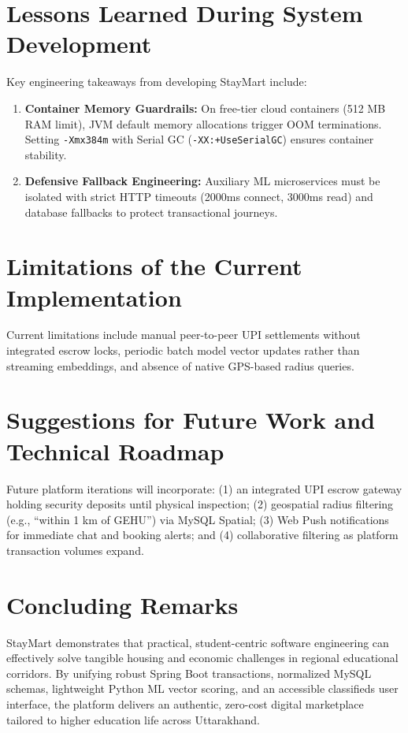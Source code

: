 \section{Lessons Learned During System Development}
Key engineering takeaways from developing StayMart include:
\begin{enumerate}
    \item \textbf{Container Memory Guardrails:} On free-tier cloud containers (512 MB RAM limit), JVM default memory allocations trigger OOM terminations. Setting \texttt{-Xmx384m} with Serial GC (\texttt{-XX:+UseSerialGC}) ensures container stability.
    \item \textbf{Defensive Fallback Engineering:} Auxiliary ML microservices must be isolated with strict HTTP timeouts (2000ms connect, 3000ms read) and database fallbacks to protect transactional journeys.
\end{enumerate}

\section{Limitations of the Current Implementation}
Current limitations include manual peer-to-peer UPI settlements without integrated escrow locks, periodic batch model vector updates rather than streaming embeddings, and absence of native GPS-based radius queries.

\section{Suggestions for Future Work and Technical Roadmap}
Future platform iterations will incorporate: (1) an integrated UPI escrow gateway holding security deposits until physical inspection; (2) geospatial radius filtering (e.g., ``within 1 km of GEHU'') via MySQL Spatial; (3) Web Push notifications for immediate chat and booking alerts; and (4) collaborative filtering as platform transaction volumes expand.

\section{Concluding Remarks}
StayMart demonstrates that practical, student-centric software engineering can effectively solve tangible housing and economic challenges in regional educational corridors. By unifying robust Spring Boot transactions, normalized MySQL schemas, lightweight Python ML vector scoring, and an accessible classifieds user interface, the platform delivers an authentic, zero-cost digital marketplace tailored to higher education life across Uttarakhand.
